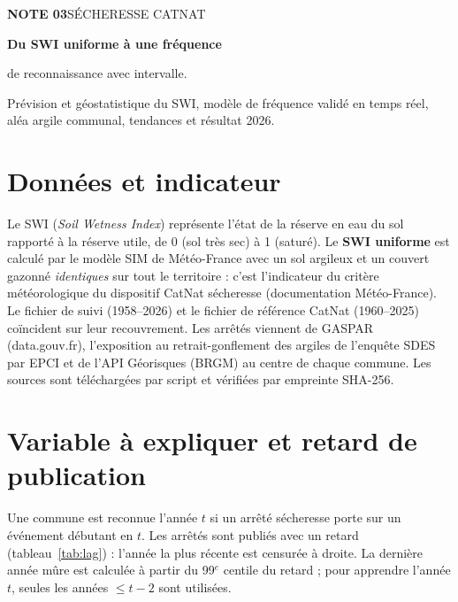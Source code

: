 \documentclass[10pt,a4paper]{article}
\begin{document}
{\small\color{Muted}\textbf{NOTE 03}\quad SÉCHERESSE CATNAT}\vspace{4mm}

{\fontsize{25}{29}\selectfont\bfseries\color{Forest}Du SWI uniforme à une fréquence\par de reconnaissance avec intervalle.}\vspace{2mm}

{\large Prévision et géostatistique du SWI, modèle de fréquence validé en temps réel, aléa argile communal, tendances et résultat 2026.}\vspace{3mm}


\section{Données et indicateur}
Le SWI (\emph{Soil Wetness Index}) représente l'état de la réserve en eau du sol rapporté à la réserve utile, de 0 (sol très sec) à 1 (saturé). Le \textbf{SWI uniforme} est calculé par le modèle SIM de Météo-France avec un sol argileux et un couvert gazonné \emph{identiques} sur tout le territoire : c'est l'indicateur du critère météorologique du dispositif CatNat sécheresse (documentation Météo-France). Le fichier de suivi (1958--2026) et le fichier de référence CatNat (1960--2025) coïncident sur leur recouvrement. Les arrêtés viennent de GASPAR (data.gouv.fr), l'exposition au retrait-gonflement des argiles de l'enquête SDES par EPCI et de l'API Géorisques (BRGM) au centre de chaque commune. Les sources sont téléchargées par script et vérifiées par empreinte SHA-256.

\section{Variable à expliquer et retard de publication}
Une commune est \og reconnue \fg{} l'année $t$ si un arrêté sécheresse porte sur un événement débutant en $t$. Les arrêtés sont publiés avec un retard (tableau~\ref{tab:lag}) : l'année la plus récente est censurée à droite. La dernière année mûre est calculée à partir du 99$^e$ centile du retard ; pour apprendre l'année $t$, seules les années $\le t-2$ sont utilisées.
\begin{table}[H]\centering\small\tabLag\caption{Retard (années) entre la fin de l'événement et la publication de l'arrêté.}\label{tab:lag}\end{table}
\end{document}
